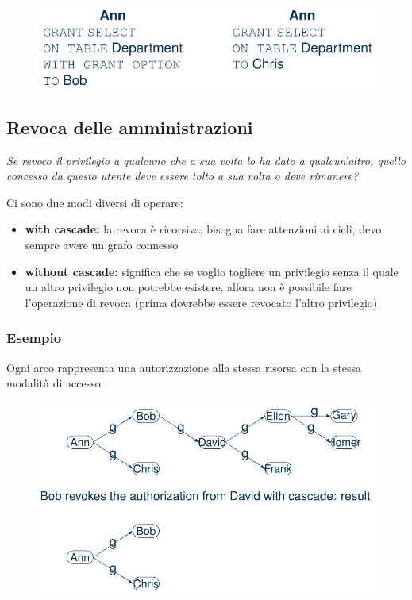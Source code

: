 \documentclass{report}
\begin{document}
\begin{figure}[H]
    \centering
    \includegraphics[width=0.6\linewidth]{images/grant.opt.png}
\end{figure}

\subsection{Revoca delle amministrazioni}
\textit{Se revoco il privilegio a qualcuno che a sua volta lo ha dato a qualcun'altro, 
quello concesso da questo utente deve essere tolto a sua volta o deve rimanere?}

\noindent Ci sono due modi diversi di operare:
\begin{itemize}
    \item \textbf{with cascade:} la revoca è ricorsiva; bisogna fare attenzioni ai cicli, devo sempre 
    avere un grafo connesso
    \item \textbf{without cascade:} significa che se voglio togliere un privilegio senza il 
    quale un altro privilegio non potrebbe esistere, allora non è possibile fare l'operazione di 
    revoca (prima dovrebbe essere revocato l'altro privilegio)
\end{itemize}

\subsubsection{Esempio}
Ogni arco rappresenta una autorizzazione alla stessa risorsa con la stessa modalità 
di accesso.

\begin{figure}[H]
    \centering
    \includegraphics[width=0.8\linewidth]{images/revoke-rec.png}
\end{figure}
\end{document}
